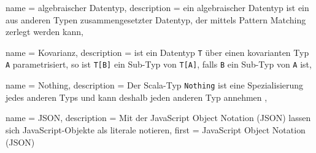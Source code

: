 






{
  name        = algebraischer Datentyp,
  description = {ein algebraischer Datentyp ist ein aus anderen Typen zusammengesetzter Datentyp, der mittels Pattern Matching zerlegt werden kann},
}


{
  name        = Kovarianz,
  description = {ist ein Datentyp \lstinline|T| über einen kovarianten Typ \lstinline|A| parametrisiert, so ist \lstinline|T[B]| ein Sub-Typ von \lstinline|T[A]|, falls \lstinline|B| ein Sub-Typ von \lstinline|A| ist},
}


{
  name        = Nothing,
  description = {Der Scala-Typ \lstinline|Nothing| ist eine Spezialisierung jedes anderen Typs und kann deshalb jeden anderen Typ annehmen \cite[vgl.][S.~216]{programming_in_scala}},
}


{
  name        = JSON,
  description = {Mit der JavaScript Object Notation (JSON) lassen sich JavaScript-Objekte als literale notieren},
  first       = {JavaScript Object Notation (JSON)}
}